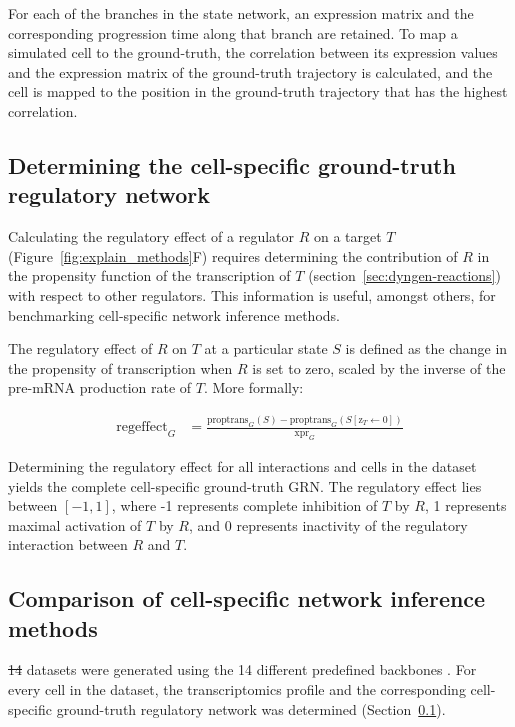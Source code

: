 \documentclass[
  table,
  10pt,
  a4paper]{article}
\providecommand{\DIFaddtex}[1]{{\protect\color{blue}\uwave{#1}}} %
\providecommand{\DIFdeltex}[1]{{\protect\color{red}\sout{#1}}}                      %
\providecommand{\DIFaddbegin}{} %
\providecommand{\DIFaddend}{} %
\providecommand{\DIFdelbegin}{} %
\providecommand{\DIFdelend}{} %
\providecommand{\DIFadd}[1]{\texorpdfstring{\DIFaddtex{#1}}{#1}} %
\providecommand{\DIFdel}[1]{\texorpdfstring{\DIFdeltex{#1}}{}} %
\newcommand{\DIFscaledelfig}{0.5}
\newlength{\DIFdelgraphicswidth} %
\newlength{\DIFdelgraphicsheight} %
\newcommand{\DIFaddincludegraphics}[2][]{{\color{blue}\fbox{\DIFOincludegraphics[#1]{#2}}}} %
\newcommand{\DIFdelincludegraphics}[2][]{%
\sbox{\DIFdelgraphicsbox}{\DIFOincludegraphics[#1]{#2}}%
\settoboxwidth{\DIFdelgraphicswidth}{\DIFdelgraphicsbox} %
\settoboxtotalheight{\DIFdelgraphicsheight}{\DIFdelgraphicsbox} %
\scalebox{\DIFscaledelfig}{%
\parbox[b]{\DIFdelgraphicswidth}{\usebox{\DIFdelgraphicsbox}\\[-\baselineskip] \rule{\DIFdelgraphicswidth}{0em}}\llap{\resizebox{\DIFdelgraphicswidth}{\DIFdelgraphicsheight}{%
\setlength{\unitlength}{\DIFdelgraphicswidth}%
\begin{picture}(1,1)%
\thicklines\linethickness{2pt} %
{\color[rgb]{1,0,0}\put(0,0){\framebox(1,1){}}}%
{\color[rgb]{1,0,0}\put(0,0){\line( 1,1){1}}}%
{\color[rgb]{1,0,0}\put(0,1){\line(1,-1){1}}}%
\end{picture}%
}\hspace*{3pt}}} %
} %
\DeclareRobustCommand{\DIFaddbegin}{\DIFOaddbegin \let\includegraphics\DIFaddincludegraphics} %
\DeclareRobustCommand{\DIFaddend}{\DIFOaddend \let\includegraphics\DIFOincludegraphics} %
\DeclareRobustCommand{\DIFdelbegin}{\DIFOdelbegin \let\includegraphics\DIFdelincludegraphics} %
\DeclareRobustCommand{\DIFdelend}{\DIFOaddend \let\includegraphics\DIFOincludegraphics} %
\begin{document}
For each of the branches in the state network, an expression matrix and
the corresponding progression time along that branch are retained. To
map a simulated cell to the ground-truth, the correlation between its
expression values and the expression matrix of the ground-truth
trajectory is calculated, and the cell is mapped to the position in the
ground-truth trajectory that has the highest correlation.

\hypertarget{sec:dyngen-extractgrn}{%
\subsection{Determining the cell-specific ground-truth regulatory
network}\label{sec:dyngen-extractgrn}}

Calculating the regulatory effect of a regulator \(R\) on a target \(T\)
(Figure~\ref{fig:explain_methods}F) requires determining the
contribution of \(R\) in the propensity function of the transcription of
\(T\) (section~\ref{sec:dyngen-reactions}) with respect to other
regulators. This information is useful, amongst others, for benchmarking
cell-specific network inference methods.

The regulatory effect of \(R\) on \(T\) at a particular state \(S\) is
defined as the change in the propensity of transcription when \(R\) is
set to zero, scaled by the inverse of the pre-mRNA production rate of
\(T\). More formally:

\begin{eqnarray*}
  \text{regeffect}_G & = \frac{\text{proptrans}_G(S) - \text{proptrans}_G(S[\text{z}_{T} \leftarrow 0])}{\text{xpr}_{G}}
\end{eqnarray*}

Determining the regulatory effect for all interactions and cells in the
dataset yields the complete cell-specific ground-truth GRN. The
regulatory effect lies between \([-1, 1]\), where -1 represents complete
inhibition of \(T\) by \(R\), 1 represents maximal activation of \(T\)
by \(R\), and 0 represents inactivity of the regulatory interaction
between \(R\) and \(T\).

\hypertarget{sec:dyngen-nicompare}{%
\subsection{Comparison of cell-specific network inference
methods}\label{sec:dyngen-nicompare}}

\DIFdelbegin \DIFdel{14 }\DIFdelend \DIFaddbegin \DIFadd{42 }\DIFaddend datasets were generated using the 14 different predefined backbones
\DIFaddbegin \DIFadd{and three different seeds}\DIFaddend . For every cell in the dataset, the
transcriptomics profile and the corresponding cell-specific ground-truth
regulatory network was determined (Section~\ref{sec:dyngen-extractgrn}).
\end{document}

